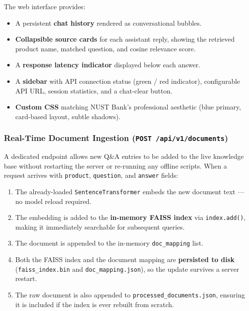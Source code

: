 \documentclass[12pt,a4paper]{article}
\begin{document}
The web interface provides:

\begin{itemize}
  \item A persistent \textbf{chat history} rendered as conversational bubbles.
  \item \textbf{Collapsible source cards} for each assistant reply, showing the
        retrieved product name, matched question, and cosine relevance score.
  \item A \textbf{response latency indicator} displayed below each answer.
  \item A \textbf{sidebar} with API connection status (green / red indicator),
        configurable API URL, session statistics, and a chat-clear button.
  \item \textbf{Custom CSS} matching NUST Bank's professional aesthetic (blue
        primary, card-based layout, subtle shadows).
\end{itemize}

\subsubsection{Real-Time Document Ingestion (\texttt{POST /api/v1/documents})}

A dedicated endpoint allows new Q\&A entries to be added to the live knowledge
base without restarting the server or re-running any offline scripts.  When a
request arrives with \texttt{product}, \texttt{question}, and \texttt{answer}
fields:

\begin{enumerate}[leftmargin=2em]
  \item The already-loaded \texttt{SentenceTransformer} embeds the new document
        text — no model reload required.
  \item The embedding is added to the \textbf{in-memory FAISS index} via
        \texttt{index.add()}, making it immediately searchable for subsequent
        queries.
  \item The document is appended to the in-memory \texttt{doc\_mapping} list.
  \item Both the FAISS index and the document mapping are \textbf{persisted to
        disk} (\texttt{faiss\_index.bin} and \texttt{doc\_mapping.json}), so the
        update survives a server restart.
  \item The raw document is also appended to \texttt{processed\_documents.json},
        ensuring it is included if the index is ever rebuilt from scratch.
\end{enumerate}
\end{document}
